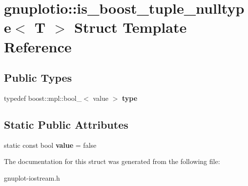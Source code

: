 \hypertarget{structgnuplotio_1_1is__boost__tuple__nulltype}{}\section{gnuplotio\+:\+:is\+\_\+boost\+\_\+tuple\+\_\+nulltype$<$ T $>$ Struct Template Reference}
\label{structgnuplotio_1_1is__boost__tuple__nulltype}
\subsection*{Public Types}
\begin{DoxyCompactItemize}
\item 
\mbox{\label{structgnuplotio_1_1is__boost__tuple__nulltype_a6b9e2eaadcaa5c788131d4e9e4186349}} 
typedef boost\+::mpl\+::bool\+\_\+$<$ value $>$ {\bfseries type}
\end{DoxyCompactItemize}
\subsection*{Static Public Attributes}
\begin{DoxyCompactItemize}
\item 
\mbox{\label{structgnuplotio_1_1is__boost__tuple__nulltype_aed42a98e58eb94c7ba55ea7d2a8f7fd2}} 
static const bool {\bfseries value} = false
\end{DoxyCompactItemize}


The documentation for this struct was generated from the following file\+:\begin{DoxyCompactItemize}
\item 
gnuplot-\/iostream.\+h\end{DoxyCompactItemize}
